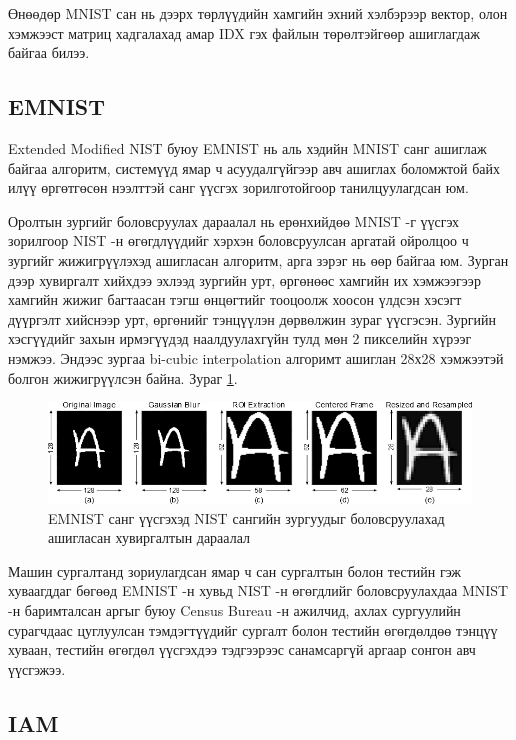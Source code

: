 Өнөөдөр MNIST сан нь дээрх төрлүүдийн хамгийн эхний хэлбэрээр вектор, олон хэмжээст матриц хадгалахад амар IDX гэх файлын төрөлтэйгөөр ашиглагдаж байгаа билээ.

\subsection{EMNIST \cite{emnist}}

Extended Modified NIST буюу EMNIST нь аль хэдийн MNIST санг ашиглаж байгаа алгоритм, системүүд ямар ч асуудалгүйгээр авч ашиглах боломжтой байх илүү өргөтгөсөн нээлттэй санг үүсгэх зорилготойгоор танилцуулагдсан юм.

Оролтын зургийг боловсруулах дараалал нь ерөнхийдөө MNIST\cite{mnist} -г үүсгэх зорилгоор NIST\cite{nist19} -н өгөгдлүүдийг хэрхэн боловсруулсан аргатай ойролцоо ч зургийг жижигрүүлэхэд ашигласан алгоритм, арга зэрэг нь өөр байгаа юм. Зурган дээр хувиргалт хийхдээ эхлээд зургийн урт, өргөнөөс хамгийн их хэмжээгээр хамгийн жижиг багтаасан тэгш өнцөгтийг тооцоолж хоосон үлдсэн хэсэгт дүүргэлт хийснээр урт, өргөнийг тэнцүүлэн дөрвөлжин зураг үүсгэсэн. Зургийн хэсгүүдийг захын ирмэгүүдэд наалдуулахгүйн тулд мөн 2 пикселийн хүрээг нэмжээ. Эндээс зургаа bi-cubic interpolation алгоримт ашиглан 28х28 хэмжээтэй болгон жижигрүүлсэн байна. Зураг \ref{fig:emnist-conversion}.

\begin{figure}[h]
	\centering
	\includegraphics[scale=0.6]{"images/emnist.png"}
	\caption{EMNIST санг үүсгэхэд NIST сангийн зургуудыг боловсруулахад ашигласан хувиргалтын дараалал \cite{emnist}}
	\label{fig:emnist-conversion}
\end{figure}

Машин сургалтанд зориулагдсан ямар ч сан сургалтын болон тестийн гэж хуваагддаг бөгөөд EMNIST -н хувьд NIST -н өгөгдлийг боловсруулахдаа MNIST -н баримталсан аргыг буюу Census Bureau -н ажилчид, ахлах сургуулийн сурагчдаас цуглуулсан тэмдэгтүүдийг сургалт болон тестийн өгөгдөлдөө тэнцүү хуваан, тестийн өгөгдөл үүсгэхдээ тэдгээрээс санамсаргүй аргаар сонгон авч үүсгэжээ.

\subsection{IAM \cite{iam-database}}

